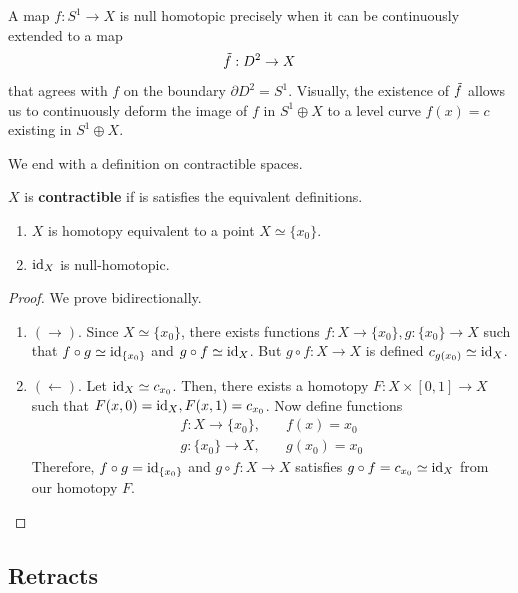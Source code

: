   \begin{example}
    \label{ex:null-homotopy-via-extension-over-the-disk}
    A map $f: S^1 \to X$ is null homotopic precisely when it can be continuously extended to a map 
    \begin{equation}
      \Tilde{f}: D^2 \to X
    \end{equation}
    that agrees with $f$ on the boundary $\partial D^2 = S^1$. Visually, the existence of $\Tilde{f}$ allows us to continuously deform the image of $f$ in $S^1 \oplus X$ to a level curve $f(x) = c$ existing in $S^1 \oplus X$. 
  \end{example}

	We end with a definition on contractible spaces. 

	\begin{definition}[Contractible]
	  \label{def:contractible}
		$X$ is \textbf{contractible} if is satisfies the equivalent definitions. 
		\begin{enumerate}
			\item $X$ is homotopy equivalent to a point $X \simeq \{x_0\}$. 
			\item $\operatorname{id}_X$ is null-homotopic. 
		\end{enumerate}
  \end{definition}
	\begin{proof}
	  We prove bidirectionally. 
		\begin{enumerate}
			\item $(\rightarrow)$. Since $X \simeq \{x_0\}$, there exists functions $f: X \to \{x_0\}, g: \{x_0\} \to X$ such that $f \circ g \simeq \operatorname{id}_{\{x_0\}}$ and $g \circ f \simeq \operatorname{id}_X$. But $g \circ f: X \to X$ is defined $c_{g(x_0)} \simeq \operatorname{id}_X$. 

			\item $(\leftarrow)$. Let $\operatorname{id}_X \simeq c_{x_0}$. Then, there exists a homotopy $F: X \times [0, 1] \to X$ such that $F(x, 0) = \operatorname{id}_X, F(x, 1) = c_{x_0}$. Now define functions 
				\begin{align}
					f: X \to \{x_0\}, & \quad f(x) = x_0 \\ 
					g: \{x_0\} \to X, & \quad g(x_0) = x_0
				\end{align}
				Therefore, $f \circ g = \operatorname{id}_{\{x_0\}}$ and $g \circ f: X \to X$ satisfies $g \circ f = c_{x_0} \simeq \operatorname{id}_X$ from our homotopy $F$. 
		\end{enumerate}
	\end{proof}

\subsection{Retracts}

